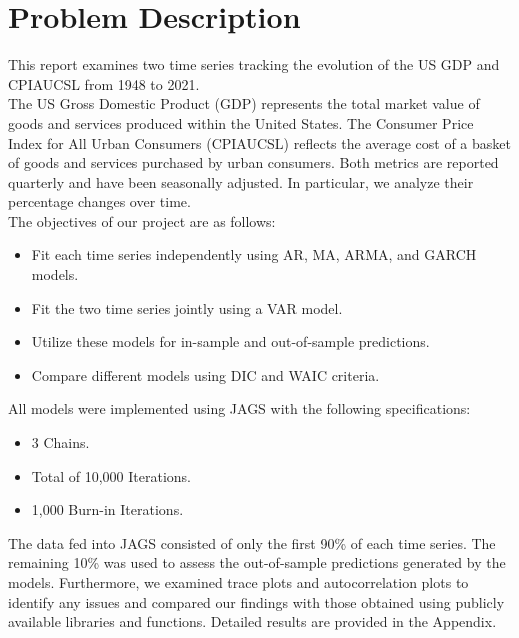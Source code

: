 \section{Problem Description}
This report examines two time series tracking the evolution of the US GDP and CPIAUCSL from 1948 to 2021. \\
The US Gross Domestic Product (GDP) represents the total market value of goods and services produced within the United States. The Consumer Price Index for All Urban Consumers (CPIAUCSL) reflects the average cost of a basket of goods and services purchased by urban consumers. Both metrics are reported quarterly and have been seasonally adjusted. In particular, we analyze their percentage changes over time. \\
The objectives of our project are as follows:
\begin{itemize}
    \item Fit each time series independently using AR, MA, ARMA, and GARCH models.
    \item Fit the two time series jointly using a VAR model.
    \item Utilize these models for in-sample and out-of-sample predictions.
    \item Compare different models using DIC and WAIC criteria.
\end{itemize}
All models were implemented using JAGS with the following specifications:
\begin{itemize}
    \item 3 Chains.
    \item Total of 10,000 Iterations.
    \item 1,000 Burn-in Iterations.
\end{itemize}
The data fed into JAGS consisted of only the first 90\% of each time series. The remaining 10\% was used to assess the out-of-sample predictions generated by the models.
Furthermore, we examined trace plots and autocorrelation plots to identify any issues and compared our findings with those obtained using publicly available libraries and functions. Detailed results are provided in the Appendix.